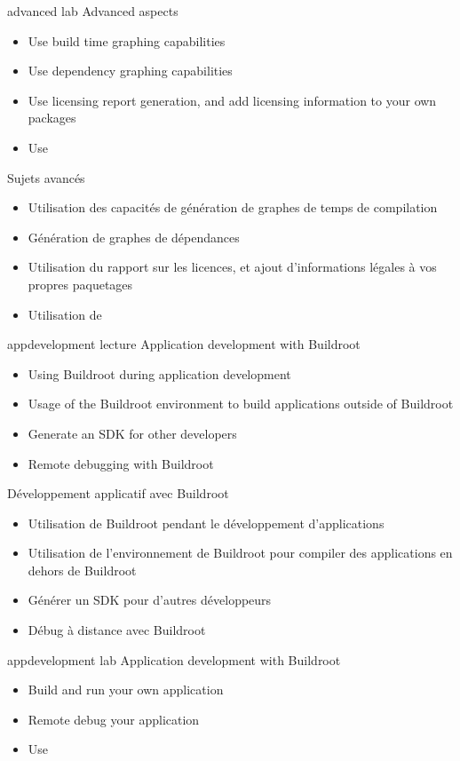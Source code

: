 {advanced}
{lab}
{Advanced aspects}
{
  \begin{itemize}
  \item Use build time graphing capabilities
  \item Use dependency graphing capabilities
  \item Use licensing report generation, and add licensing
    information to your own packages
  \item Use 
  \end{itemize}
}
{Sujets avancés}
{
  \begin{itemize}
  \item Utilisation des capacités de génération de graphes de temps de
	compilation
  \item Génération de graphes de dépendances
  \item Utilisation du rapport sur les licences, et ajout d'informations
	légales à vos propres paquetages 
  \item Utilisation de 
  \end{itemize}
}
{appdevelopment}
{lecture}
{Application development with Buildroot}
{
  \begin{itemize}
  \item Using Buildroot during application development
  \item Usage of the Buildroot environment to build applications
    outside of Buildroot
  \item Generate an SDK for other developers
  \item Remote debugging with Buildroot
  \end{itemize}
}
{Développement applicatif avec Buildroot}
{
  \begin{itemize}
  \item Utilisation de Buildroot pendant le développement d'applications
  \item Utilisation de l'environnement de Buildroot pour compiler des
	applications en dehors de Buildroot
  \item Générer un SDK pour d'autres développeurs
  \item Débug à distance avec Buildroot
  \end{itemize}
}
{appdevelopment}
{lab}
{Application development with Buildroot}
{
  \begin{itemize}
  \item Build and run your own application
  \item Remote debug your application
  \item Use 
  \end{itemize}
}
